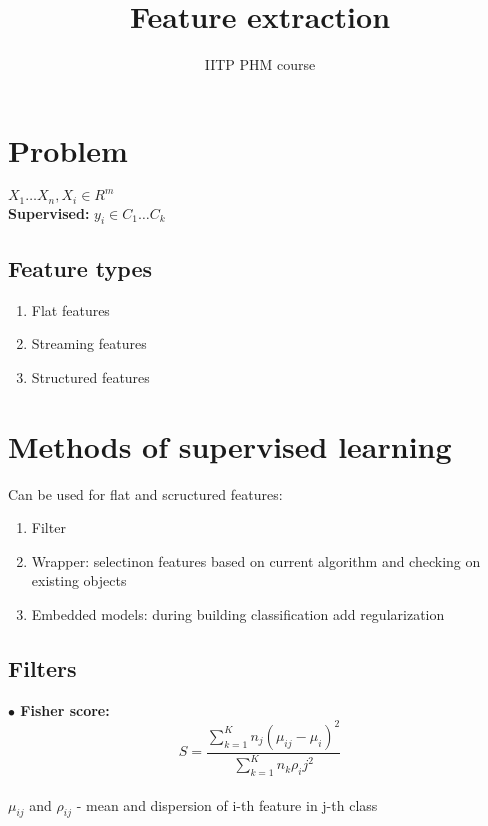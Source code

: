 \documentclass[11pt]{article}
\title{Feature extraction}
\author{IITP PHM course}
\begin{document}
\maketitle

\section{Problem}

$X_1 \ldots X_n, X_i \in R^{m}$ \\

\textbf{Supervised: } 
$y_i \in {C_1 \ldots C_k}$ \\

\subsection{Feature types}
\begin{enumerate}
\item Flat features
\item Streaming features
\item Structured features
\end{enumerate}


\section{Methods of supervised learning}

Can be used for flat and scructured features: \\
\begin{enumerate}
\item Filter
\item Wrapper: selectinon features based on current algorithm and checking on existing objects
\item Embedded models: during building classification add regularization
\end{enumerate}

\subsection{Filters}

\textbf{$\bullet$ Fisher score: }\\

$$S = \frac{\sum_{k=1}^K n_j(\mu_{ij} - \mu_i)^2}{\sum_{k=1}^K n_k \rho_ij^2} $$ \\

$\mu_{ij}$ and $\rho_{ij}$ - mean and dispersion of i-th feature in j-th class \\
\end{document}
